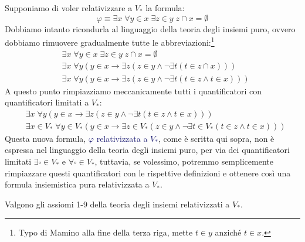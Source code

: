 \begin{example}
	Supponiamo di voler relativizzare a $V_*$ la formula:
	\[ \varphi \equiv \exists x \; \forall y \in x \; \exists z \in y \; z \cap x = \emptyset
		\]
	Dobbiamo intanto ricondurla al linguaggio della teoria degli insiemi puro, ovvero dobbiamo rimuovere gradualmente tutte le abbreviazioni:\footnote{Typo di Mamino alla fine della terza riga, mette $t \in y$ anziché $t \in x$.}
	\begin{align*}
		& \exists x \; \forall y \in x \; \exists z \in y \; z \cap x = \emptyset \\
		& \exists x \; \forall y (y \in x \rightarrow \exists z (z \in y \land \neg \exists t (t \in z \cap x))) \\
		& \exists x \; \forall y (y \in x \rightarrow \exists z (z \in y \land \neg \exists t (t \in z \land t \in x)))
	\end{align*}
	A questo punto rimpiazziamo meccanicamente tutti i quantificatori con quantificatori limitati a $V_*$:
	\begin{align*}
		& \exists x \; \forall y (y \in x \rightarrow \exists z (z \in y \land \neg \exists t (t \in z \land t \in x))) \\
		& \exists x\in V_* \; \forall y \in V_* (y \in x \rightarrow \exists z \in V_* (z \in y \land \neg \exists t \in V_* (t \in z \land t \in x)))
	\end{align*}
	Questa nuova formula, \textcolor{MidnightBlue}{$\varphi$ relativizzata a $V_*$}, come è scritta qui sopra, non è espressa nel linguaggio della teoria degli insiemi puro, per via dei quantificatori limitati $\exists \square \in V_*$ e $\forall \square \in V_*$,
	tuttavia, se volessimo, potremmo semplicemente rimpiazzare questi quantificatori con le rispettive definizioni e ottenere così una formula insiemistica pura relativizzata a $V_*$.
\end{example}

\begin{theorem}
	Valgono gli assiomi 1-9 della teoria degli insiemi relativizzati a $V_*$.
\end{theorem}

